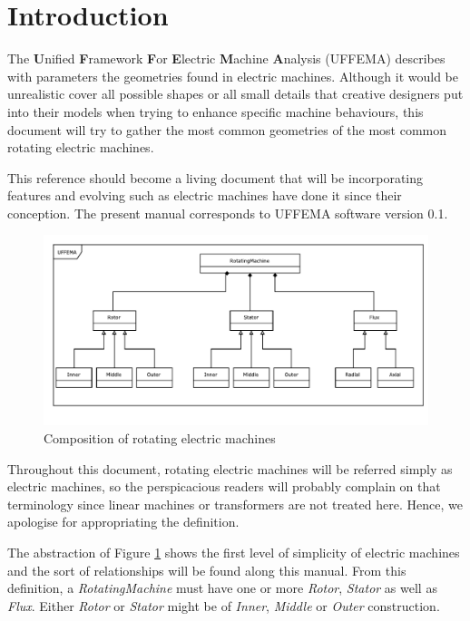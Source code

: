 \documentclass{tufte-book} %
\newcommand{\uffemaVersion}{0.1}
\begin{document}
\cleardoublepage
\chapter*{Introduction} %

The \textbf{U}nified \textbf{F}ramework \textbf{F}or \textbf{E}lectric \textbf{M}achine \textbf{A}nalysis (UFFEMA) describes with parameters the geometries found in electric machines. Although it would be unrealistic cover all possible shapes or all small details that creative designers put into their models when trying to enhance specific machine behaviours, this document will try to gather the most common geometries of the most common rotating electric machines.

This reference should become a living document that will be incorporating features and evolving such as electric machines have done it since their conception. The present manual corresponds to UFFEMA software version \uffemaVersion.  

\begin{figure}[h]
\includegraphics[width=\linewidth]{Overview.pdf}
\caption{ Composition of rotating electric machines 
}
\label{fig:overview}
\end{figure}

Throughout this document, rotating electric machines will be referred simply as electric machines, so the perspicacious readers will probably complain on that terminology since linear machines or transformers are not treated here.  Hence, we apologise for appropriating the definition.     

The abstraction of Figure \ref{fig:overview} shows the first level of simplicity of electric machines and the sort of relationships will be found along this manual. From this definition, a \textit{RotatingMachine} must have one or more \textit{Rotor}, \textit{Stator} as well as \textit{Flux}. Either \textit{Rotor} or \textit{Stator} might be of \textit{Inner}, \textit{Middle} or \textit{Outer} construction.
\end{document}
